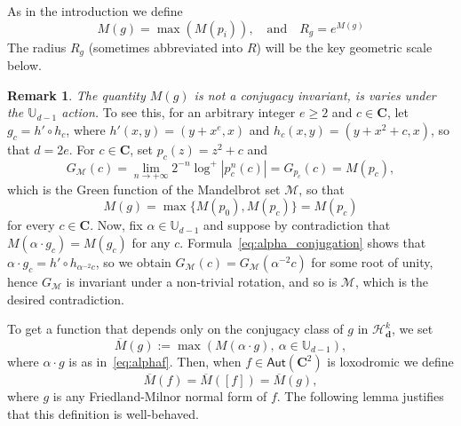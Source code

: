\documentclass[oneside, 12pt]{amsart}
\newcommand{\abs}[1]{\left\vert#1\right\vert}
\newcommand{\C}{\mathbf{C}}
\newcommand{\Aut}{\mathsf{Aut}}
\theoremstyle{plain}
\theoremstyle{definition}
\newtheorem{rem}[thm]{Remark}
\numberwithin{equation}{section}       %
\numberwithin{equation}{section}       %
\begin{document}
As in %
the introduction we define
\begin{equation}
M(g) = \max (M(p_i)), \quad \text{and} \quad R_g = e^{M(g)}
\end{equation}
The radius $R_g$  (sometimes abbreviated into $R$) will be the key geometric scale below. 

\begin{rem} {\emph{The quantity $M(g)$ is not a conjugacy invariant, 
is varies under the $\mathbb{U}_{d-1}$ action.}}
To see this, for  an arbitrary integer $e\geq 2$ and  $c\in \C$, let  $g_c=h'\circ h_c$, 
where $h'(x,y)=(y+x^e, x)$ and $h_c(x,y)=(y+x^2+c,x)$, 
so that  $d=2e$.  For $c\in \C$, set $p_c(z)=z^2+c$ and 
\[
G_{\mathcal M}(c)=\lim_{n\to +\infty} 2^{-n} \log^+\abs{p_c^n(c)} = G_{p_c}(c)=M(p_c),
\]
which is the Green function of the Mandelbrot set $\mathcal M$, so that 
 \begin{equation}
 M(g)=\max\{M(p_0), M(p_c)\}=M(p_c)
 \end{equation} 
 for every $c\in \C$. 
Now, fix $\alpha\in \mathbb{U}_{d-1}$ and 
suppose by contradiction that $M(\alpha\cdot g_c)=M(g_c)$ for     any $c$. 
Formula~\eqref{eq:alpha_conjugation} shows that 
 $\alpha\cdot g_c=h'\circ h_{\alpha^{-2}c}$, so  we obtain 
$G_{\mathcal M}(c)=G_{\mathcal M}(\alpha^{-2}c)$ for some   root of unity, 
hence $G_{\mathcal M}$ is invariant under a non-trivial rotation, and so is $\mathcal M$, which is the desired 
  contradiction. 
  \end{rem}

To get a function that depends only on the conjugacy class of $g$ in $\mathcal H^k_{\mathbf d}$, we set
 \begin{equation}\overline M(g) := \max(M(\alpha\cdot g), \ \alpha\in \mathbb U_{d-1}),\end{equation} where $\alpha\cdot g$ is as in~\eqref{eq:alphaf}. 
 Then, when $f\in \Aut(\C^2)$ is loxodromic   we define 
 \begin{equation}
 \overline M(f) = \overline M([f]) = \overline M(g),
 \end{equation} 
 where $g$ is any Friedland-Milnor normal form of $f$. The following lemma justifies 
  that this definition is well-behaved. 
\end{document}
